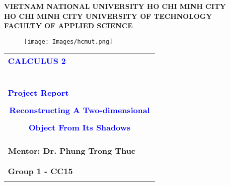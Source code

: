 \documentclass[a4paper]{article}
\begin{document}
\begin{titlepage}

\begin{center}
\textbf{\Large VIETNAM NATIONAL UNIVERSITY HO CHI MINH CITY} \\

\vspace{7pt}
\textbf{\Large HO CHI MINH CITY UNIVERSITY OF TECHNOLOGY} \\

\vspace{7pt}
\textbf{\Large FACULTY OF APPLIED SCIENCE}
\end{center}

\vspace{1cm}

\begin{figure}[h!]
\begin{center}
\texttt{[image: Images/hcmut.png]}
\end{center}
\end{figure}

\vspace{1cm}


\begin{center}
\begin{tabular}{ccc}
	\multicolumn{3}{l}{\textbf{{\Large \textcolor{blue}{CALCULUS 2}}}}\\
	~~\\
	\arrayrulecolor{blue}\hline
	\\
	\multicolumn{3}{l}{\textbf{{\Large \textcolor{blue}{Project Report} }}}\\
	\\
	
	\multicolumn{3}{c}{\textbf{{\Huge \textcolor{blue}{Reconstructing A Two-dimensional  }}}}\\
	\\

    \multicolumn{3}{c}{\textbf{{\Huge \textcolor{blue}{Object From Its Shadows}}}}\\
	\\
	\arrayrulecolor{blue}\hline \\ \\

    \multicolumn{1}{l}{\textbf{\Large Mentor: Dr. Phung Trong Thuc}} \\
    \\ \\
    \multicolumn{1}{l}{\textbf{\Large Group 1 - CC15}} \\ \\
    

\end{tabular}
\end{center}
\end{titlepage}
\end{document}
